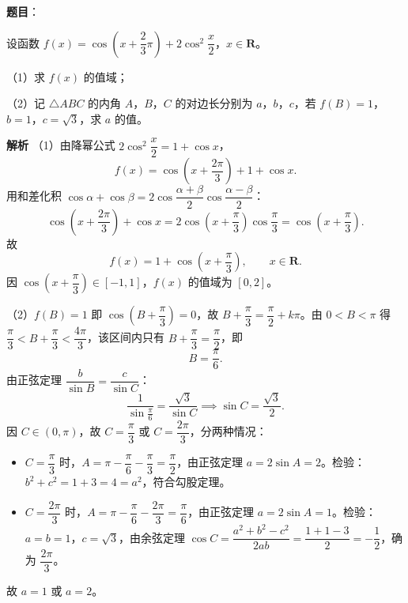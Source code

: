 \begin{answer}

\textbf{题目}：

设函数 $f(x)=\cos\left(x+\dfrac23\pi\right)+2\cos^2\dfrac x2$，$x\in\mathbf R$。

（1）求 $f(x)$ 的值域；

（2）记 $\triangle ABC$ 的内角 $A$，$B$，$C$ 的对边长分别为 $a$，$b$，$c$，若 $f(B)=1$，$b=1$，$c=\sqrt3$，求 $a$ 的值。

\textbf{解析}
（1）由降幂公式 $2\cos^2\dfrac{x}{2}=1+\cos x$，
\nopagebreak[4]
\[f(x)=\cos\left(x+\frac{2\pi}{3}\right)+1+\cos x.\]
用和差化积 $\cos\alpha+\cos\beta=2\cos\dfrac{\alpha+\beta}{2}\cos\dfrac{\alpha-\beta}{2}$：
\nopagebreak[4]
\[\cos\left(x+\frac{2\pi}{3}\right)+\cos x=2\cos\left(x+\frac{\pi}{3}\right)\cos\frac{\pi}{3}=\cos\left(x+\frac{\pi}{3}\right).\]
故
\nopagebreak[4]
\[f(x)=1+\cos\left(x+\frac{\pi}{3}\right),\qquad x\in\mathbf R.\]
因 $\cos\left(x+\dfrac{\pi}{3}\right)\in\left[-1,1\right]$，$f(x)$ 的值域为 $\left[0,2\right]$。

（2）$f(B)=1$ 即 $\cos\left(B+\dfrac{\pi}{3}\right)=0$，故 $B+\dfrac{\pi}{3}=\dfrac{\pi}{2}+k\pi$。由 $0<B<\pi$ 得 $\dfrac{\pi}{3}<B+\dfrac{\pi}{3}<\dfrac{4\pi}{3}$，该区间内只有 $B+\dfrac{\pi}{3}=\dfrac{\pi}{2}$，即
\nopagebreak[4]
\[B=\frac{\pi}{6}.\]
由正弦定理 $\dfrac{b}{\sin B}=\dfrac{c}{\sin C}$：
\nopagebreak[4]
\[\frac{1}{\sin\frac{\pi}{6}}=\frac{\sqrt3}{\sin C}\implies \sin C=\frac{\sqrt3}{2}.\]
因 $C\in\left(0,\pi\right)$，故 $C=\dfrac{\pi}{3}$ 或 $C=\dfrac{2\pi}{3}$，分两种情况：
\begin{itemize}
\item $C=\dfrac{\pi}{3}$ 时，$A=\pi-\dfrac{\pi}{6}-\dfrac{\pi}{3}=\dfrac{\pi}{2}$，由正弦定理 $a=2\sin A=2$。检验：$b^2+c^2=1+3=4=a^2$，符合勾股定理。
\item $C=\dfrac{2\pi}{3}$ 时，$A=\pi-\dfrac{\pi}{6}-\dfrac{2\pi}{3}=\dfrac{\pi}{6}$，由正弦定理 $a=2\sin A=1$。检验：$a=b=1$，$c=\sqrt3$，由余弦定理 $\cos C=\dfrac{a^2+b^2-c^2}{2ab}=\dfrac{1+1-3}{2}=-\dfrac12$，确为 $\dfrac{2\pi}{3}$。
\end{itemize}
故 $a=1$ 或 $a=2$。


\end{answer}

